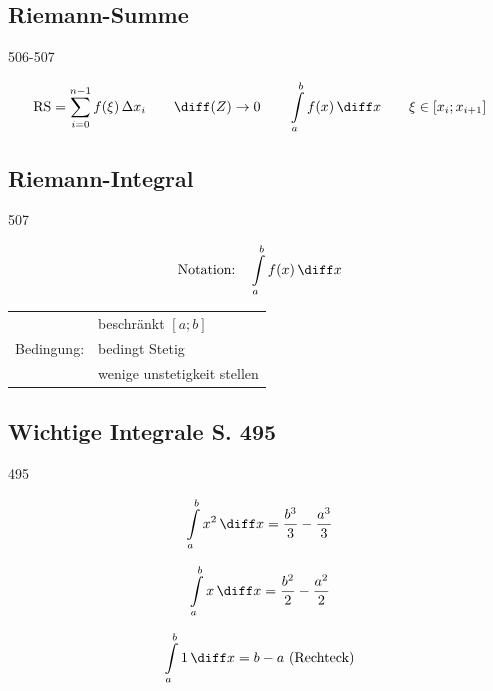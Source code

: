 \subsection{Riemann-Summe}{506-507}

\vspace{-0.2cm}
$$ \text{RS} = \sum \limits_{i=0}^{n-1} f(\xi) \, \Delta x_i  \qquad \diff (Z) \to 0 \qquad \int \limits_{a}^{b} f(x) \,  \diff x \qquad\xi \in [x_i ; x_{i+1}] $$	

\subsection{Riemann-Integral}{507}

\begin{minipage}{0.4\columnwidth}
    $$ \text{Notation:} \quad \int \limits_{a}^{b} f(x) \, \diff x $$
\end{minipage}				
\hfill
\begin{minipage}{0.55\columnwidth}
    \begin{tabular}{ll}
                & beschränkt $[a;b]$\\
    Bedingung:  & bedingt Stetig\\
                & wenige unstetigkeit stellen
    \end{tabular}
\end{minipage}	


\subsection{Wichtige Integrale S. 495}{495}

\begin{minipage}[c]{0.26\columnwidth}
    $$ \int \limits_{a}^{b} x^2 \, \diff x = \frac{b^3}{3} - \frac{a^3}{3} $$
\end{minipage}
\hfill
\begin{minipage}[c]{0.26\columnwidth}
    $$ \int \limits_{a}^{b} x \, \diff x = \frac{b^2}{2} - \frac{a^2}{2} $$
\end{minipage}
\hfill
\begin{minipage}[c]{0.35\columnwidth}
    $$ \int \limits_{a}^{b} 1 \, \diff x = b - a  \text{ (Rechteck)} $$ 
\end{minipage}



